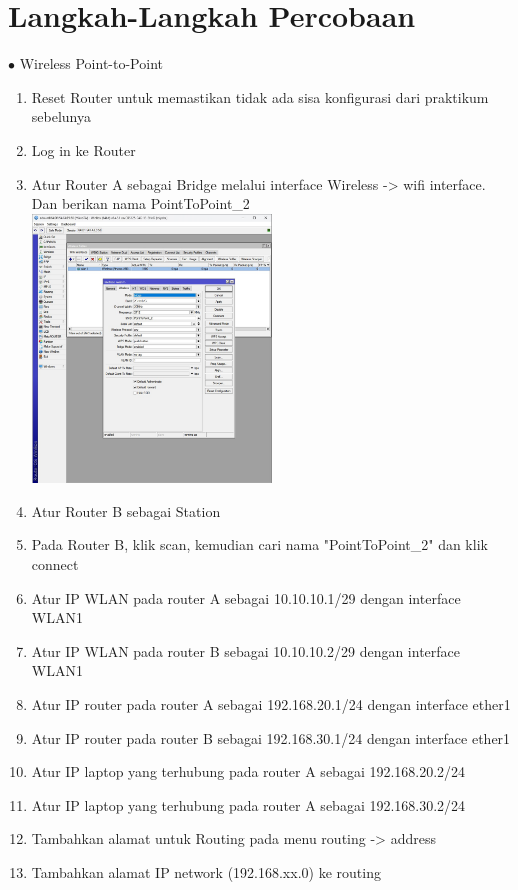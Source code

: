 \section{Langkah-Langkah Percobaan}
$\bullet$ Wireless Point-to-Point
\begin{enumerate}
	\item Reset Router untuk memastikan tidak ada sisa konfigurasi dari praktikum sebelunya
	\item Log in ke Router
	\item Atur Router A sebagai Bridge melalui interface Wireless -> wifi interface. Dan berikan nama PointToPoint\_2\\
	\includegraphics[width=0.5\textwidth]{p4/img/bridge.jpg}
	\item Atur Router B sebagai Station
	\item Pada Router B, klik scan, kemudian cari nama "PointToPoint\_2" dan klik connect
	\item Atur IP WLAN pada router A sebagai 10.10.10.1/29 dengan interface WLAN1
	\item Atur IP WLAN pada router B sebagai 10.10.10.2/29 dengan interface WLAN1
	\item Atur IP router pada router A sebagai 192.168.20.1/24 dengan interface ether1
	\item Atur IP router pada router B sebagai 192.168.30.1/24 dengan interface ether1
	\item Atur IP laptop yang terhubung pada router A sebagai 192.168.20.2/24
	\item Atur IP laptop yang terhubung pada router A sebagai 192.168.30.2/24
	\item Tambahkan alamat untuk Routing pada menu routing -> address\\
	\item Tambahkan alamat IP network (192.168.xx.0) ke routing\\

\end{enumerate}
